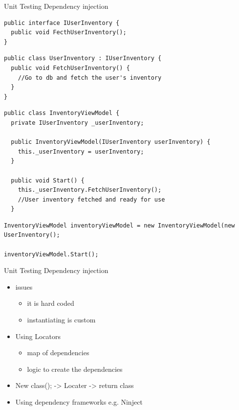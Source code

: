 \begin{frame} [fragile] {Unit Testing} {Dependency injection}

\begin{lstlisting}
public interface IUserInventory {
  public void FecthUserInventory();
}
\end{lstlisting}

\begin{lstlisting}
public class UserInventory : IUserInventory {
  public void FetchUserInventory() {
    //Go to db and fetch the user's inventory
  }
}
\end{lstlisting}

\begin{lstlisting}
public class InventoryViewModel {
  private IUserInventory _userInventory;
  
  public InventoryViewModel(IUserInventory userInventory) {
    this._userInventory = userInventory;
  }
  
  public void Start() {
    this._userInventory.FetchUserInventory();
    //User inventory fetched and ready for use
  }
\end{lstlisting}

\begin{lstlisting}
InventoryViewModel inventoryViewModel = new InventoryViewModel(new UserInventory();

inventoryViewModel.Start();
\end{lstlisting}

\end{frame}

\begin{frame} {Unit Testing} {Dependency injection}

\begin{itemize}
	\item issues
		\begin{itemize}
			\item it is hard coded
			\item instantiating is custom
		\end{itemize}
\end{itemize}

\begin{itemize}
	\item Using Locators
		\begin{itemize}
			\item map of dependencies
			\item logic to create the dependencies
		\end{itemize}
	\item New class(); -> Locater -> return class
	\item Using dependency frameworks e.g. Ninject 
\end{itemize}

\end{frame}